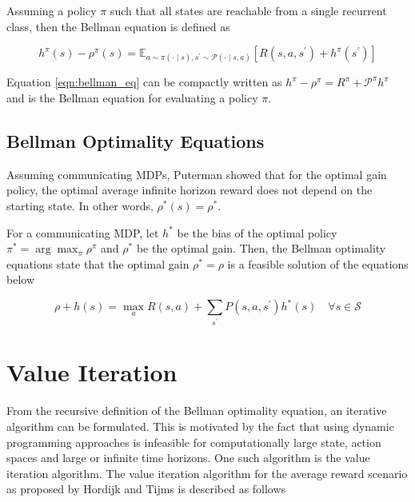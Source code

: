 Assuming a policy $\pi$ such that all states are reachable from a single recurrent class, then the Bellman equation is defined as

\begin{equation}
    \label{eqn:bellman_eq}
    h^\pi(s) - \rho^\pi(s) = \mathbb{E}_{a \sim \pi(\cdot \mid s), s^\prime \sim \mathcal{P}(\cdot \mid  s, a)} \left[ R(s, a, s^\prime) + h^\pi(s^\prime) \right]
\end{equation}

Equation \ref{eqn:bellman_eq} can be compactly written as $h^\pi - \rho^\pi = R^\pi + \mathcal{P}^\pi h^\pi$ and is the Bellman equation for evaluating a policy $\pi$.

\subsection{Bellman Optimality Equations}

Assuming communicating MDPs, Puterman \cite{puterman_chapter_1990} showed that for the optimal gain policy, the optimal average infinite horizon reward does not depend on the starting state. In other words, $\rho^*(s) = \rho^*$.

For a communicating MDP, let $h^*$ be the bias of the optimal policy $\pi^* = \arg \max_\pi \rho^\pi$ and $\rho^*$ be the optimal gain. 
Then, the Bellman optimality equations state that the optimal gain $\rho^* = \rho$ is a feasible solution of the equations below 

\begin{equation}
    \rho + h(s) = \max_a R(s, a) + \sum_{s^\prime} P(s, a, s^\prime) h^*(s) \quad \forall s \in \mathcal{S}
\end{equation}

\section{Value Iteration}

From the recursive definition of the Bellman optimality equation, an iterative algorithm can be formulated. 
This is motivated by the fact that using dynamic programming approaches is infeasible for computationally large state, action spaces and large or infinite time horizons.
One such algorithm is the value iteration algorithm. The value iteration algorithm for the average reward scenario as proposed by Hordijk and Tijms \cite{hordijk_modified_1975} is described as follows

